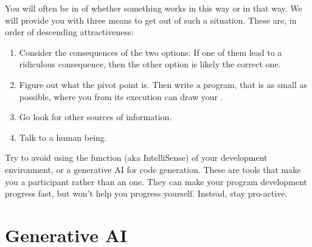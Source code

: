 \begin{inspiration}{\cite{buffy_s1e8}}
\end{inspiration}

You will often be in  of whether something works in this way or in that way. We will provide you with three means to get out of such a situation. These are, in order of descending attractiveness:
\begin{enumerate}
  \item Consider the consequences of the two options: If one of them lead to a ridiculous consequence, then the other option is likely the correct one.
  \item Figure out what the pivot point is. Then write a program, that is as small as possible, where you from its execution can draw your .
  \item Go look for other sources of information.
  \item Talk to a human being.
\end{enumerate}

Try to avoid using the  function (aka IntelliSense) of your development environment, or a generative AI for code generation. These are tools that make you a  participant rather than an  one. They can make your program development progress fast, but won't help you progress yourself. Instead, stay pro-active.

\section{Generative AI}

